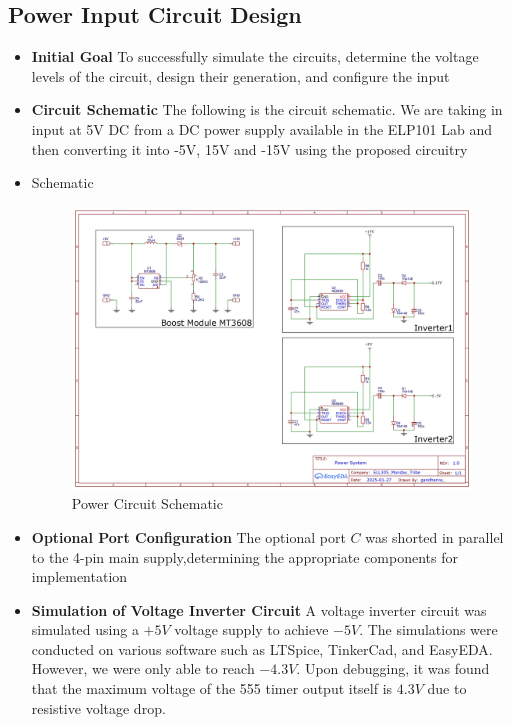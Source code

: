 \documentclass[12pt,a4paper]{article}
\begin{document}
\subsection{Power Input Circuit Design}
\begin{itemize}
     

\item \textbf{Initial Goal}  To successfully simulate the circuits, determine the voltage levels of the circuit, design their generation, and configure the input
\item \textbf{Circuit Schematic} The following is the circuit schematic. We are taking in input at 5V DC from a DC power supply available in the ELP101 Lab and then converting it into -5V, 15V and -15V using the proposed circuitry
\item{Schematic}
\begin{figure}[H]
    \centering
    \includegraphics[width=\linewidth]{Schematic_pi_ini_2025-01-28_page-0001.jpg}
    \caption{Power Circuit Schematic}
    \label{fig:enter-label}
\end{figure}
\item \textbf{Optional Port Configuration}
The optional port \( C \) was shorted in parallel to the 4-pin main supply,determining the appropriate components for implementation

\item \textbf{Simulation of Voltage Inverter Circuit}
A voltage inverter circuit was simulated using a \( +5V \) voltage supply to achieve \( -5V \). The simulations were conducted on various software such as LTSpice, TinkerCad, and EasyEDA. However, we were only able to reach \( -4.3V \). Upon debugging, it was found that the maximum voltage of the 555 timer output itself is \( 4.3V \) due to resistive voltage drop.


\end{itemize}
\end{document}
